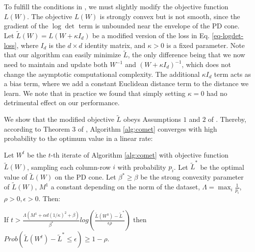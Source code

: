\documentclass[twoside,11pt]{article}
\newcommand\mat[1]{{#1}}
\newcommand{\W}{\mat{W}}
\newcommand{\tL}{\tilde{L}(\W)}
\begin{document}
To fulfill the conditions in \citep{richtarik2013optimal}, we must slightly modify the objective function $L({\W})$. The objective $L(\W)$ is strongly convex but is not smooth, since the gradient of the $\log \det$ term is unbounded near the envelope of the PD cone. Let $\tilde{L}({\W}) = L({\W + \kappa I_d})$ be a modified version of the loss in Eq. \ref{eq-logdet-loss}, where $I_d$ is the $d \times d$ identity matrix, and $\kappa>0$ is a fixed parameter.
Note that our algorithm can easily minimize $\tilde{L}$, the only difference being that we now need to maintain and update both $\W^{-1}$ and $(\W+\kappa I_d)^{-1}$, which does not change the asymptotic computational complexity. The additional $\kappa I_d$ term acts as a bias term, where we add a constant Euclidean distance term to the distance we learn. We note that in practice we found that simply setting $\kappa=0$ had no detrimental effect on our performance. 

We show that the modified objective $\tilde{L}$ obeys Assumptions $1$ and $2$ of \citet{richtarik2013optimal}. Thereby, according to Theorem 3 of \citeauthor{richtarik2013optimal}, Algorithm \ref{alg:comet} converges with high probability to the optimum value in a linear rate:

\begin{theorem}
    Let $\W^t$ be the $t$-th iterate of Algorithm \ref{alg:comet} with objective function $\tL$, sampling each column-row $i$ with probability $p_i$. Let $\tilde{L}^*$ be the optimal value of $\tL$ on the PD cone. Let $\beta^* \geq \beta$ be the strong convexity parameter of $\tL$, $M^1$ a constant depending on the norm of the dataset, $\Lambda = \max_i \frac{1}{p_i}$, $\rho >0, \epsilon>0$. Then:

    If $t > \frac{\Lambda (M^1 + \alpha d (1/\kappa)^2 + \beta)}{\beta^*} log \left( \frac{\tilde{L}(W^0) - \tilde{L}^*}{\epsilon \rho}\right)$ then $Prob(\tilde{L}(\W^t) - \tilde{L}^* \leq \epsilon) \geq 1-\rho$.
\end{theorem}
\end{document}
